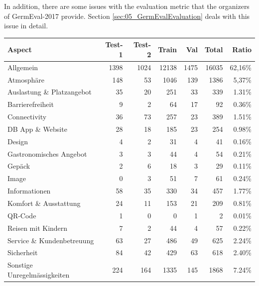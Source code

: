 In addition, there are some issues with the evaluation metric that the organizers of GermEval-2017 provide. Section \ref{sec:05_GermEvalEvaluation} deals with this issue in detail.
\begin{table}
	\centering
	\begin{tabular}{lrrrrrr}
		\toprule
		Aspect                       & Test-1 & Test-2 & Train  & Val  & Total  & Ratio   \\ 
		\midrule
		Allgemein                    & 1398   & 1024   & 12138  & 1475 & 16035  & 62,16\% \\
		Atmosphäre                   & 148    & 53     & 1046   & 139  & 1386   & 5,37\%  \\
		Auslastung \& Platzangebot   & 35     & 20     & 251    & 33   & 339    & 1.31\%  \\
		Barrierefreiheit             & 9      & 2      & 64     & 17   & 92     & 0.36\%  \\
		Connectivity                 & 36     & 73     & 257    & 23   & 389    & 1.51\%  \\
		DB App \& Website            & 28     & 18     & 185    & 23   & 254    & 0.98\%  \\
		Design                       & 4      & 2      & 31     & 4    & 41     & 0.16\%  \\
		Gastronomisches Angebot      & 3      & 3      & 44     & 4    & 54     & 0.21\%  \\
		Gepäck                       & 2      & 6      & 18     & 3    & 29     & 0.11\%  \\
		Image                        & 0      & 3      & 51     & 7    & 61     & 0.24\%  \\
		Informationen                & 58     & 35     & 330    & 34   & 457    & 1.77\%  \\
		Komfort \& Ausstattung       & 24     & 11     & 153    & 21   & 209    & 0.81\%  \\
		QR-Code                      & 1      & 0      & 0      & 1    & 2      & 0.01\%  \\
		Reisen mit Kindern           & 7      & 2      & 44     & 4    & 57     & 0.22\%  \\
		Service \& Kundenbetreuung   & 63     & 27     & 486    & 49   & 625    & 2.24\%  \\
		Sicherheit                   & 84     & 42     & 429    & 63   & 618    & 2.40\%  \\
		Sonstige Unregelmässigkeiten & 224    & 164    & 1335   & 145  & 1868   & 7.24\%  \\

\end{tabular}
\end{table}
